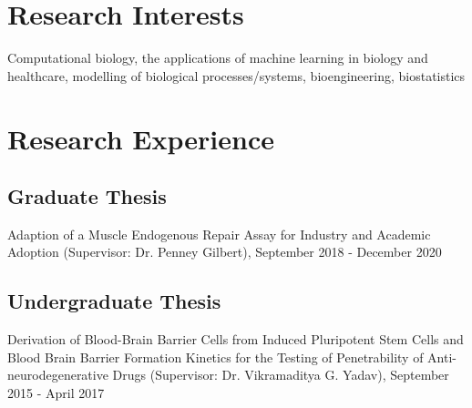 \documentclass[letterpaper]{article}
\renewenvironment{itemize}{
  \begin{list}{}{
    \setlength{\leftmargin}{1.5em}
  }
}{
  \end{list}
}
\begin{document}
\section*{\textbf{Research Interests}}
\begin{itemize}
\item Computational biology, the applications of machine learning in biology and healthcare, modelling of biological processes/systems, bioengineering, biostatistics
\end{itemize} 

\section*{\textbf{Research Experience}}

\subsection*{Graduate Thesis}
\begin{itemize}
    \item Adaption of a Muscle Endogenous Repair Assay for Industry and Academic Adoption (Supervisor: Dr. Penney Gilbert), September 2018 - December 2020 
\end{itemize}

\subsection*{Undergraduate Thesis}

\begin{itemize}
\item Derivation of Blood-Brain Barrier Cells from Induced Pluripotent Stem Cells and Blood Brain Barrier Formation Kinetics for the Testing of Penetrability of Anti-neurodegenerative Drugs (Supervisor: Dr. Vikramaditya G. Yadav), September 2015 - April 2017 
\end{itemize}

\end{document}
